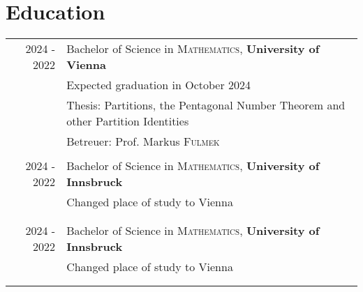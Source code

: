 \documentclass[a4paper,10pt]{article} %
\begin{document}

\section{Education}

\begin{tabular}{rl}	
2024 - 2022& Bachelor of Science in \textsc{Mathematics}, \textbf{University of Vienna}\\
& Expected graduation in October 2024 \\
& Thesis: Partitions, the Pentagonal Number Theorem and other Partition Identities\\ &\small Betreuer: Prof. Markus \textsc{Fulmek}\\
&\\

2024 - 2022& Bachelor of Science in \textsc{Mathematics}, \textbf{University of Innsbruck}\\
& Changed  place of study to Vienna\\
& \\
&\\

2024 - 2022& Bachelor of Science in \textsc{Mathematics}, \textbf{University of Innsbruck}\\
& Changed  place of study to Vienna\\
&\\
&\\






\end{tabular}
\end{document}
